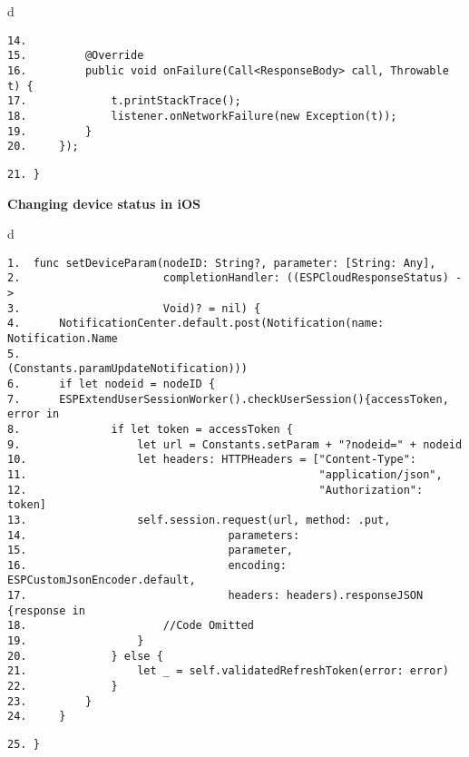 \documentclass[a4paper,12pt]{book}
\begin{document}
\begin{codebloc}
\begin{tabular}{d}
\vspace{2pt}
\begin{verbatim}
14.
15.         @Override
16.         public void onFailure(Call<ResponseBody> call, Throwable t) {
17.             t.printStackTrace();
18.             listener.onNetworkFailure(new Exception(t));
19.         }
20.     });
\end{verbatim}
\verb|21. }|
\end{tabular}
\end{codebloc}

\vspace{6pt}
\textbf{Changing device status in iOS}


\begin{codebloc}
\begin{tabular}{d}
\vspace{2pt}
\begin{verbatim}
1.  func setDeviceParam(nodeID: String?, parameter: [String: Any],
2.                      completionHandler: ((ESPCloudResponseStatus) ->
3.                      Void)? = nil) {
4.      NotificationCenter.default.post(Notification(name: Notification.Name
5.                                  (Constants.paramUpdateNotification)))
6.      if let nodeid = nodeID {
7.      ESPExtendUserSessionWorker().checkUserSession(){accessToken, error in
8.              if let token = accessToken {
9.                  let url = Constants.setParam + "?nodeid=" + nodeid
10.	                let headers: HTTPHeaders = ["Content-Type":
11.                                             "application/json", 
12.                                             "Authorization": token]
13.                 self.session.request(url, method: .put, 
14.                               parameters:
15.                               parameter, 
16.                               encoding: ESPCustomJsonEncoder.default,
17.                               headers: headers).responseJSON {response in
18.                     //Code Omitted
19.                 }
20.             } else {
21.                 let _ = self.validatedRefreshToken(error: error)
22.             }
23.         }
24.     }
\end{verbatim}
\verb|25. }|
\end{tabular}
\end{codebloc}
\end{document}
